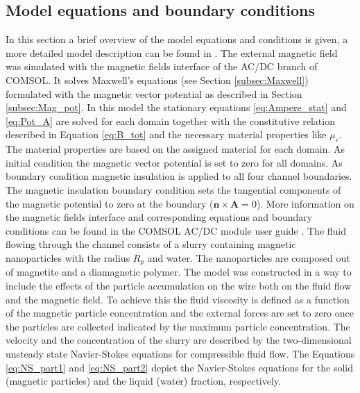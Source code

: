 \subsection{Model equations and boundary conditions}
\label{subsec:model_eq_BC}
In this section a brief overview of the model equations and conditions is given, a more detailed model description can be found in \cite{choomphon2017simulation}. The external magnetic field was simulated with the magnetic fields interface of the AC/DC branch of COMSOL. It solves Maxwell's equations (see Section \ref{subsec:Maxwell}) formulated with the magnetic vector potential as described in Section \ref{subsec:Mag_pot}. In this model the stationary equations \ref{eq:Ampere_stat} and \ref{eq:Pot_A} are solved for each domain together with the constitutive relation described in Equation \ref{eq:B_tot} and the necessary material properties like $\mu_{r}$. The material properties are based on the assigned material for each domain. As initial condition the magnetic vector potential is set to zero for all domains.  As boundary condition magnetic insulation is applied to all four channel boundaries. The magnetic insulation boundary condition sets the tangential components of the magnetic potential to zero at the boundary ($\boldsymbol{n}\times\boldsymbol{A} = 0$). More information on the magnetic fields interface and corresponding equations and boundary conditions can be found in the COMSOL AC/DC module user guide \cite{ComsolACDC}. \newline
The fluid flowing through the channel consists of a slurry containing magnetic nanoparticles with the radius $R_{p}$ and water. The nanoparticles are composed out of magnetite and a diamagnetic polymer. The model was constructed in a way to include the effects of the particle accumulation on the wire both on the fluid flow and the magnetic field. To achieve this the fluid viscosity is defined as a function of the magnetic particle concentration and the external forces are set to zero once the particles are collected indicated by the maximum particle concentration. The velocity and the concentration of the slurry are described by the two-dimensional unsteady state Navier-Stokes equations for compressible fluid flow. The Equations \ref{eq:NS_part1} and \ref{eq:NS_part2} depict the Navier-Stokes equations for the solid (magnetic particles) and the liquid (water) fraction, respectively. 

